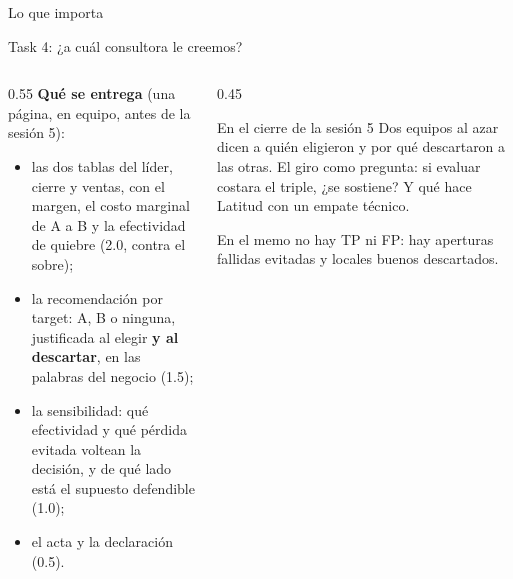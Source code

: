 \documentclass{beamer}
\begin{document}
\begin{frame}{Lo que importa}
\end{frame}

\begin{frame}{Task 4: ¿a cuál consultora le creemos?}
\begin{columns}[T]
\begin{column}{0.55\textwidth}
\textbf{Qué se entrega} (una página, en equipo, antes de la sesión 5):
\begin{itemize}\itemsep2pt
  \item las dos tablas del líder, cierre y ventas, con el margen, el costo marginal de A a B y la efectividad de quiebre (2.0, contra el sobre);
  \item la recomendación por target: A, B o ninguna, justificada al elegir \textbf{y al descartar}, en las palabras del negocio (1.5);
  \item la sensibilidad: qué efectividad y qué pérdida evitada voltean la decisión, y de qué lado está el supuesto defendible (1.0);
  \item el acta y la declaración (0.5).
\end{itemize}
\end{column}
\begin{column}{0.45\textwidth}
\begin{exampleblock}{En el cierre de la sesión 5}
Dos equipos al azar dicen a quién eligieron y por qué descartaron a las otras. El giro como pregunta: si evaluar costara el triple, ¿se sostiene? Y qué hace Latitud con un empate técnico.
\end{exampleblock}
\small En el memo no hay TP ni FP: hay aperturas fallidas evitadas y locales buenos descartados.
\end{column}
\end{columns}
\end{frame}
\end{document}
